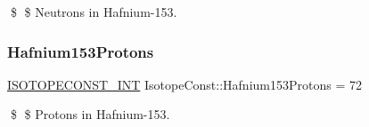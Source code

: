 \$ \$ Neutrons in Hafnium-\/153. \mbox{\label{group___isotope_const-_hafnium-_hf153_gab0f8e78c03788f561bb9b9680500d7d9}} 
\subsubsection{\texorpdfstring{Hafnium153\+Protons}{Hafnium153Protons}}
{\footnotesize\ttfamily \mbox{\hyperlink{group___isotope_const-_macros_ga5f18360b3e99483a35c32d789e62621c}{I\+S\+O\+T\+O\+P\+E\+C\+O\+N\+S\+T\+\_\+\+I\+NT}} Isotope\+Const\+::\+Hafnium153\+Protons = 72}

\$ \$ Protons in Hafnium-\/153. 